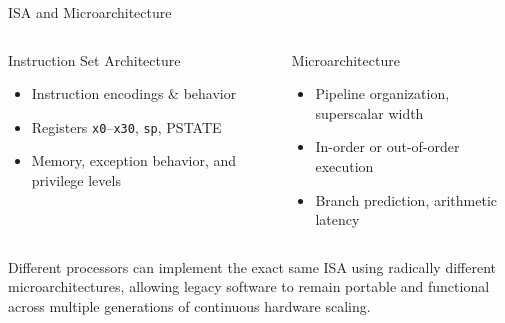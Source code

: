 \documentclass[aspectratio=169,11pt,t]{beamer}
\newcommand{\bits}[1]{\texttt{#1}}
\begin{document}

\begin{frame}{ISA and Microarchitecture}

\begin{columns}[T,onlytextwidth]


\begin{block}{Instruction Set Architecture}
\begin{itemize}
  \item Instruction encodings \& behavior
  \item Registers \bits{x0}--\bits{x30}, \bits{sp}, PSTATE
  \item Memory, exception behavior, and privilege levels
\end{itemize}
\end{block}


\begin{block}{Microarchitecture}
\begin{itemize}
  \item Pipeline organization, superscalar width
  \item In-order or out-of-order execution
  \item Branch prediction, arithmetic latency
\end{itemize}
\end{block}

\end{columns}

\vfill

Different processors can implement the exact same ISA using radically different microarchitectures, allowing legacy software to remain portable and functional across multiple generations of continuous hardware scaling.

\end{frame}






\end{document}
